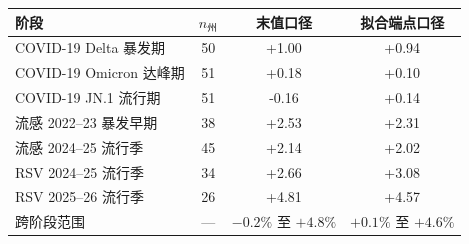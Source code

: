 \begin{tabular}{lccc}
\toprule
阶段 & $n_{\text{州}}$ & 末值口径 & 拟合端点口径 \\
\midrule
COVID-19 Delta 暴发期 & 50 & +1.00 & +0.94 \\
COVID-19 Omicron 达峰期 & 51 & +0.18 & +0.10 \\
COVID-19 JN.1 流行期 & 51 & -0.16 & +0.14 \\
流感 2022--23 暴发早期 & 38 & +2.53 & +2.31 \\
流感 2024--25 流行季 & 45 & +2.14 & +2.02 \\
RSV 2024--25 流行季 & 34 & +2.66 & +3.08 \\
RSV 2025--26 流行季 & 26 & +4.81 & +4.57 \\
\midrule
跨阶段范围 & --- & $-0.2\%$ 至 $+4.8\%$ & $+0.1\%$ 至 $+4.6\%$ \\
\bottomrule
\end{tabular}
